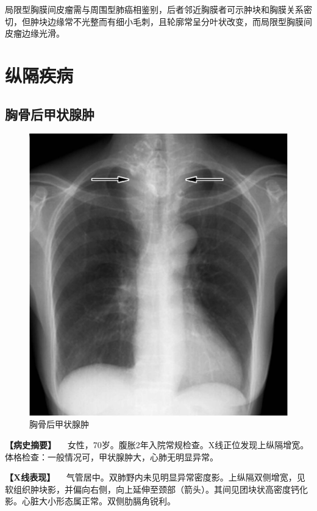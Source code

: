局限型胸膜间皮瘤需与周围型肺癌相鉴别，后者邻近胸膜者可示肿块和胸膜关系密切，但肿块边缘常不光整而有细小毛刺，且轮廓常呈分叶状改变，而局限型胸膜间皮瘤边缘光滑。

\section{纵隔疾病}

\subsection{胸骨后甲状腺肿}

\begin{figure}[!htbp]
 \centering
 \includegraphics{./images/Image00194.jpg}
 \captionsetup{justification=centering}
 \caption{胸骨后甲状腺肿}
 \label{fig3-12-1}
  \end{figure} 

\textbf{【病史摘要】}
　女性，70岁。腹胀2年入院常规检查。X线正位发现上纵隔增宽。体格检查：一般情况可，甲状腺肿大，心肺无明显异常。

\textbf{【X线表现】}
　气管居中。双肺野内未见明显异常密度影。上纵隔双侧增宽，见软组织肿块影，并偏向右侧，向上延伸至颈部（箭头）。其间见团块状高密度钙化影。心脏大小形态属正常。双侧肋膈角锐利。

